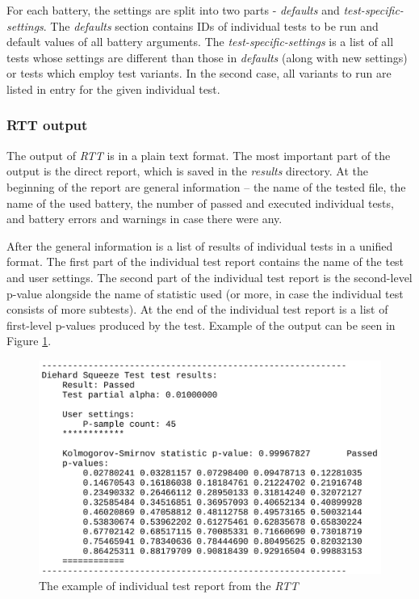 \documentclass[
  digital,     %
  oneside,     %
  nosansbold,  %
  nocolorbold, %
  nolof,         %
  nolot,         %
]{fithesis4}
\begin{document}
For each battery, the settings are split into two parts - \emph{defaults} and \emph{test-specific-settings}. The \emph{defaults} section contains IDs of individual tests to be run and default values of all battery arguments. The \emph{test-specific-settings} is a list of all tests whose settings are different than those in \emph{defaults} (along with new settings) or tests which employ test variants. In the second case, all variants to run are listed in entry for the given individual test.

\subsubsection{RTT output}
The output of \emph{RTT} is in a plain text format. The most important part of the output is the direct report, which is saved in the \emph{results} directory. At the beginning of the report are general information -- the name of the tested file, the name of the used battery, the number of passed and executed individual tests, and battery errors and warnings in case there were any.

After the general information is a list of results of individual tests in a unified format. The first part of the individual test report contains the name of the test and user settings. The second part of the individual test report is the second-level p-value alongside the name of statistic used (or more, in case the individual test consists of more subtests). At the end of the individual test report is a list of first-level p-values produced by the test. Example of the output can be seen in Figure \ref{fig:rtt_output_example}.

\begin{figure}[h]
  \begin{center}
    \includegraphics[width=12cm]{figures/rtt_dieharder_output.jpg}
  \end{center}
  \caption{The example of individual test report from the \emph{RTT}}
  \label{fig:rtt_output_example}
\end{figure}
\end{document}
